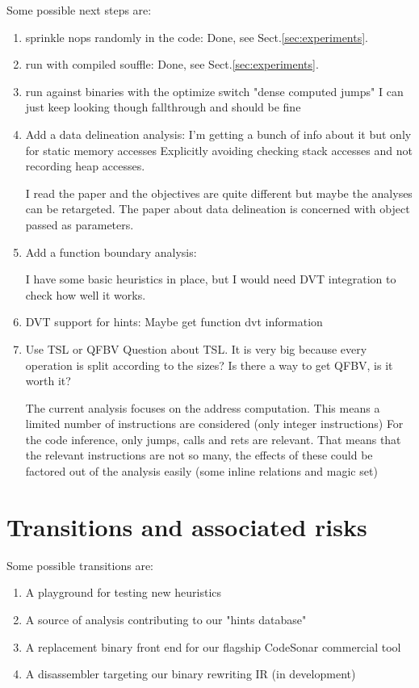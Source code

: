 \documentclass[]{llncs}
\begin{document}
  Some possible next steps are:
  \begin{enumerate}
  \item sprinkle nops randomly in the code:
    Done, see Sect.\ref{sec:experiments}.
  \item run with compiled souffle:
    Done, see Sect.\ref{sec:experiments}.
  \item run against binaries with the optimize switch "dense computed jumps"
    I can just keep looking though fallthrough and should be fine

  \item Add a data delineation analysis:
    I'm getting a bunch of info about it but only for static memory accesses
    Explicitly avoiding checking stack accesses and not recording heap accesses.
    
    I read the paper and the objectives are quite different but maybe the analyses
    can be retargeted. The paper about data delineation is concerned with object
    passed as parameters.

  \item Add a function boundary analysis:

    I have some basic heuristics in place, but I would need DVT integration
    to check how well it works.

  \item DVT support for hints:
    Maybe get function dvt information
  \item Use TSL or QFBV
    Question about TSL. It is very big because every operation is split according to
    the sizes? Is there a way to get QFBV, is it worth it?

    The current analysis focuses on the address computation. This means a limited number
    of instructions are considered (only integer instructions)
    For the code inference, only jumps, calls and rets are relevant.
    That means that the relevant instructions are not so many, the effects of these could
    be factored out of the analysis easily (some inline relations and magic set)

  \end{enumerate}


\section{Transitions and associated risks}
\label{sec:risks}
Some possible transitions are:
\begin{enumerate}
\item  A playground for testing new heuristics
\item  A source of analysis contributing to our "hints database"
\item  A replacement binary front end for our flagship CodeSonar commercial tool
\item  A disassembler targeting our binary rewriting IR (in development)
\end{enumerate}
\end{document}
